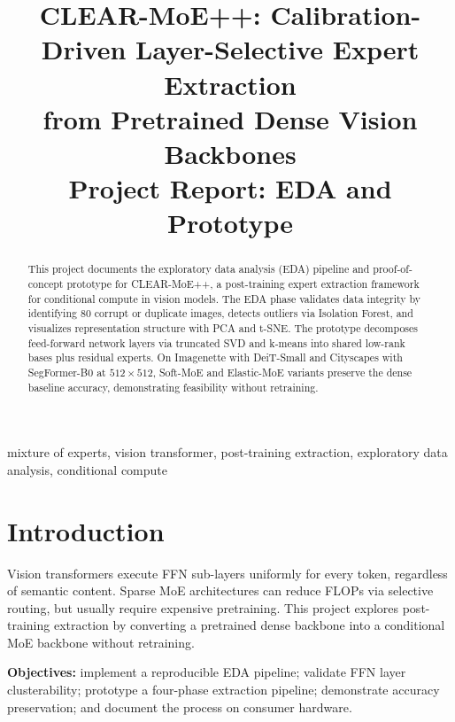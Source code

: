 \documentclass[conference]{IEEEtran}
\begin{document}
\title{CLEAR-MoE++: Calibration-Driven Layer-Selective Expert Extraction\\
from Pretrained Dense Vision Backbones\\
{\normalsize Project Report: EDA and Prototype}}

\author{
}

\maketitle

\begin{abstract}
This project documents the exploratory data analysis (EDA) pipeline and proof-of-concept prototype for CLEAR-MoE++, a post-training expert extraction framework for conditional compute in vision models. The EDA phase validates data integrity by identifying 80 corrupt or duplicate images, detects outliers via Isolation Forest, and visualizes representation structure with PCA and t-SNE. The prototype decomposes feed-forward network layers via truncated SVD and k-means into shared low-rank bases plus residual experts. On Imagenette with DeiT-Small and Cityscapes with SegFormer-B0 at $512\times512$, Soft-MoE and Elastic-MoE variants preserve the dense baseline accuracy, demonstrating feasibility without retraining.
\end{abstract}

\begin{IEEEkeywords}
mixture of experts, vision transformer, post-training extraction, exploratory data analysis, conditional compute
\end{IEEEkeywords}

\section{Introduction}
Vision transformers execute FFN sub-layers uniformly for every token, regardless of semantic content. Sparse MoE architectures can reduce FLOPs via selective routing, but usually require expensive pretraining. This project explores post-training extraction by converting a pretrained dense backbone into a conditional MoE backbone without retraining.

\textbf{Objectives:} implement a reproducible EDA pipeline; validate FFN layer clusterability; prototype a four-phase extraction pipeline; demonstrate accuracy preservation; and document the process on consumer hardware.
\end{document}
